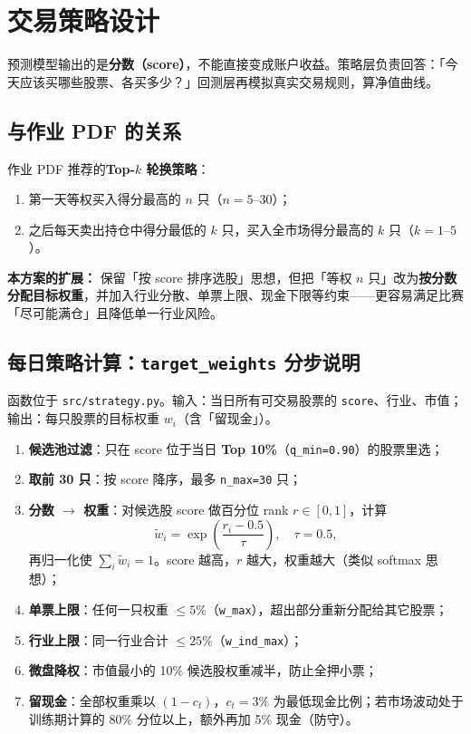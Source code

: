 \documentclass[UTF8,a4paper,12pt]{ctexart}
\begin{document}
\section{交易策略设计}

预测模型输出的是\textbf{分数（score）}，不能直接变成账户收益。策略层负责回答：「今天应该买哪些股票、各买多少？」回测层再模拟真实交易规则，算净值曲线。

\subsection{与作业 PDF 的关系}

作业 PDF 推荐的\textbf{Top-$k$ 轮换策略}：
\begin{enumerate}[leftmargin=2em]
  \item 第一天等权买入得分最高的 $n$ 只（$n=5\text{--}30$）；
  \item 之后每天卖出持仓中得分最低的 $k$ 只，买入全市场得分最高的 $k$ 只（$k=1\text{--}5$）。
\end{enumerate}

\textbf{本方案的扩展：} 保留「按 score 排序选股」思想，但把「等权 $n$ 只」改为\textbf{按分数分配目标权重}，并加入行业分散、单票上限、现金下限等约束——更容易满足比赛「尽可能满仓」且降低单一行业风险。

\subsection{每日策略计算：\texttt{target\_weights} 分步说明}

函数位于 \texttt{src/strategy.py}。输入：当日所有可交易股票的 \texttt{score}、行业、市值；输出：每只股票的目标权重 $w_i$（含「留现金」）。

\begin{enumerate}[leftmargin=2em]
  \item \textbf{候选池过滤}：只在 score 位于当日 \textbf{Top 10\%}（\texttt{q\_min=0.90}）的股票里选；
  \item \textbf{取前 30 只}：按 score 降序，最多 \texttt{n\_max=30} 只；
  \item \textbf{分数 $\to$ 权重}：对候选股 score 做百分位 rank $r\in[0,1]$，计算
  \begin{equation}
    \tilde{w}_i = \exp\!\left(\frac{r_i - 0.5}{\tau}\right),\quad \tau=0.5,
  \end{equation}
  再归一化使 $\sum_i \tilde{w}_i = 1$。score 越高，$r$ 越大，权重越大（类似 softmax 思想）；
  \item \textbf{单票上限}：任何一只权重 $\le 5\%$（\texttt{w\_max}），超出部分重新分配给其它股票；
  \item \textbf{行业上限}：同一行业合计 $\le 25\%$（\texttt{w\_ind\_max}）；
  \item \textbf{微盘降权}：市值最小的 10\% 候选股权重减半，防止全押小票；
  \item \textbf{留现金}：全部权重乘以 $(1-c_t)$，$c_t=3\%$ 为最低现金比例；若市场波动处于训练期计算的 80\% 分位以上，额外再加 5\% 现金（防守）。
\end{enumerate}
\end{document}
